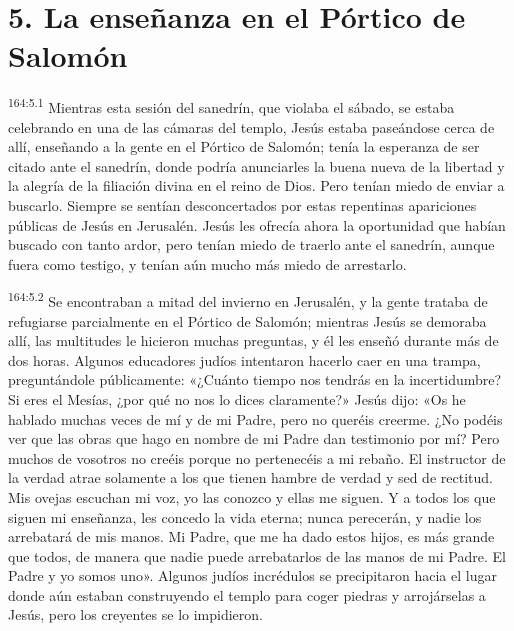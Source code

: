 \section*{5. La enseñanza en el Pórtico de Salomón}
\par 
\textsuperscript{164:5.1} Mientras esta sesión del sanedrín, que violaba el sábado, se estaba celebrando en una de las cámaras del templo, Jesús estaba paseándose cerca de allí, enseñando a la gente en el Pórtico de Salomón; tenía la esperanza de ser citado ante el sanedrín, donde podría anunciarles la buena nueva de la libertad y la alegría de la filiación divina en el reino de Dios. Pero tenían miedo de enviar a buscarlo. Siempre se sentían desconcertados por estas repentinas apariciones públicas de Jesús en Jerusalén. Jesús les ofrecía ahora la oportunidad que habían buscado con tanto ardor, pero tenían miedo de traerlo ante el sanedrín, aunque fuera como testigo, y tenían aún mucho más miedo de arrestarlo.

\par 
\textsuperscript{164:5.2} Se encontraban a mitad del invierno en Jerusalén, y la gente trataba de refugiarse parcialmente en el Pórtico de Salomón; mientras Jesús se demoraba allí, las multitudes le hicieron muchas preguntas, y él les enseñó durante más de dos horas. Algunos educadores judíos intentaron hacerlo caer en una trampa, preguntándole públicamente: «¿Cuánto tiempo nos tendrás en la incertidumbre? Si eres el Mesías, ¿por qué no nos lo dices claramente?» Jesús dijo: «Os he hablado muchas veces de mí y de mi Padre, pero no queréis creerme. ¿No podéis ver que las obras que hago en nombre de mi Padre dan testimonio por mí? Pero muchos de vosotros no creéis porque no pertenecéis a mi rebaño. El instructor de la verdad atrae solamente a los que tienen hambre de verdad y sed de rectitud. Mis ovejas escuchan mi voz, yo las conozco y ellas me siguen. Y a todos los que siguen mi enseñanza, les concedo la vida eterna; nunca perecerán, y nadie los arrebatará de mis manos. Mi Padre, que me ha dado estos hijos, es más grande que todos, de manera que nadie puede arrebatarlos de las manos de mi Padre. El Padre y yo somos uno». Algunos judíos incrédulos se precipitaron hacia el lugar donde aún estaban construyendo el templo para coger piedras y arrojárselas a Jesús, pero los creyentes se lo impidieron.

